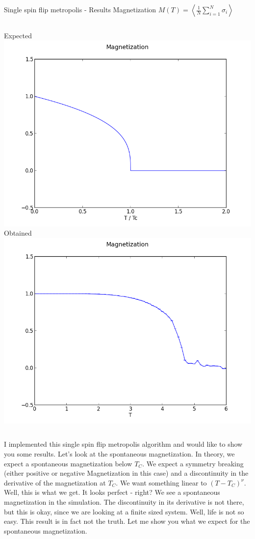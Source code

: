 \documentclass[]{beamer}
\begin{document}
\begin{frame}{Single spin flip metropolis - Results}
\pause
Magnetization \( M(T) = \left< \frac{1}{N} \sum\limits_{i=1}^N \sigma_i \right> \)
\begin{columns}[c]
	\pause
	\centering Expected
	\includegraphics[width=\textwidth]{img/single_magnetization_theoretical.png}
	\pause
	\centering Obtained
	\includegraphics[width=\textwidth]{img/single_magnetization_size15.png}
\end{columns}
 {I implemented this single spin flip metropolis algorithm and would like to show you some results.}
 {Let's look at the spontaneous magnetization.}
 {In theory, we expect a spontaneous magnetization below \(T_C\). We expect a symmetry breaking (either positive or negative Magnetization in this case) and a discontinuity in the derivative of the magnetization at \(T_C\). We want something linear to \( (T-T_C)^\nu \).}
 {Well, this is what we get. It looks perfect - right? We see a spontaneous magnetization in the simulation. The discontinuity in its derivative is not there, but this is okay, since we are looking at a finite sized system.
Well, life is not so easy. This result is in fact not the truth. Let me show you what we expect for the spontaneous magnetization.}
\end{frame}
\end{document}
